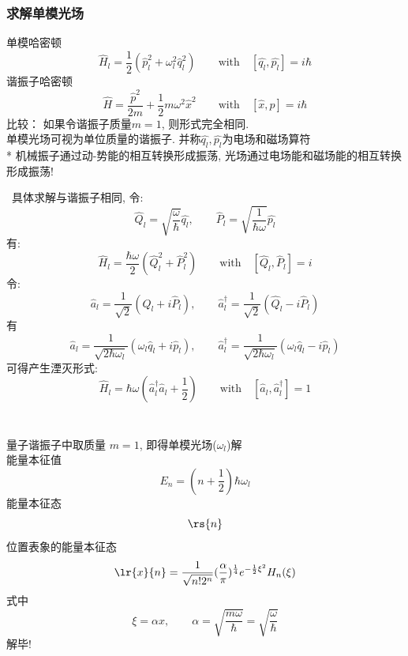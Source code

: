   \begin{frame} 
  \frametitle{求解单模光场}
    单模哈密顿
    \[ \hat{H}_l  =  \frac{1}{2}(\hat{p}_l ^2 + \omega_l ^2 \hat{q}_l ^2 )  \qquad \text{with} \quad [\hat{q_l},\hat{p_l}] =i\hbar\] 
    谐振子哈密顿
    \begin{equation*}
        \hat{H} = \frac{\hat{p}^2 }{2m} + \dfrac{1}{2} m \omega ^2 \hat{x}^2   \qquad \text{with} \quad [\hat{x},\hat{p}]=i\hbar 
    \end{equation*}	
    比较： 如果令谐振子质量$m =1$, 则形式完全相同.  \\ 
    单模光场可视为单位质量的谐振子. 并称$\hat{q_l},\hat{p_l}$为电场和磁场算符\\ {\vspace*{1.3em}}
    * 机械振子通过动-势能的相互转换形成振荡, 光场通过电场能和磁场能的相互转换形成振荡!
\end{frame}

\begin{frame}   
  ~{\Bullet}具体求解与谐振子相同, 令:
    \[ \hat{Q}_l = \sqrt{\frac{\omega}{\hbar}}\hat{q_l}, \qquad \hat{P}_l = \sqrt{\frac{1}{\hbar \omega}} \hat{p_l} \]
    有:
    \[  \hat{H}_l= \frac{\hbar \omega }{2} (\hat{Q}^2 _l + \hat{P}^2 _l) \qquad \text{with} \quad [\hat{Q}_l,\hat{P}_l]=i \]
    令:
    \[ \hat{a}_l= \frac{1 }{\sqrt{2}} (\hat{Q} _l+ i\hat{P}_l ), \qquad \hat{a}^\dagger _l = \frac{1 }{\sqrt{2}} (\hat{Q}_l - i\hat{P}_l ) \]
    有
    \[
        \hat{a}_l = \frac{1}{\sqrt{2\hbar \omega_l}} (\omega_l\hat{q}_l+i \hat{p}_l)  , \qquad
        \hat{a}_l ^\dagger = \frac{1}{\sqrt{2\hbar \omega_l}} (\omega_l\hat{q}_l-i \hat{p}_l)  
    \]  
    可得产生湮灭形式:
    \[  \hat{H}_l= \hbar \omega \left(\hat{a}^\dagger _l \hat{a} _l + \frac{1 }{2}\right) \qquad \text{with} \quad [\hat{a}_l,\hat{a}^\dagger _l]=1 \]
\end{frame}

\begin{frame} 
\frametitle{}
~\\
    量子谐振子中取质量 $m=1$, 即得单模光场($\omega_l$)解 \\  \vspace*{1.3em}
    能量本征值
    \[ E_n=(n+\dfrac{1}{2})\hbar \omega_l \]
    能量本征态
    \[ \rs{n} \]
    位置表象的能量本征态
    \[ \lr{x}{n} = \frac{1}{\sqrt{n!2^n}} (\frac{\alpha}{\pi})^{\frac{1}{4}} e^{- \frac{1 }{2 } \xi^2} H_n(\xi) \]
    式中
    \[ \xi = \alpha x, \qquad \alpha =\sqrt{\frac{m \omega }{\hbar}} = \sqrt{\frac{\omega }{\hbar}}  \]
    解毕!
\end{frame}


